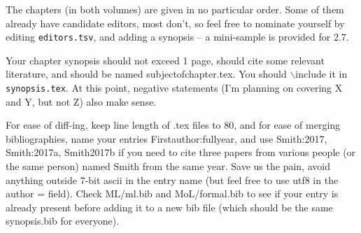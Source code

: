\noindent
The chapters (in both volumes) are given in no particular order. Some of them
already have candidate editors, most don't, so feel free to nominate yourself
by editing {\tt editors.tsv}, and adding a synopsis -- a mini-sample is
provided for 2.7.

Your chapter synopsis should not exceed 1 page, should cite some relevant
literature, and should be named subjectofchapter.tex. You should 
$\backslash$include it in {\tt synopsis.tex}. At this point, negative statements
(I'm planning on covering X and Y, but not Z) also make sense.

For ease of diff-ing, keep line length of .tex files to 80, and for ease of
merging bibliographies, name your entries Firstauthor:fullyear, and use
Smith:2017, Smith:2017a, Smith2017b if you need to cite three papers from
various people (or the same person) named Smith from the same year. Save us
the pain, avoid anything outside 7-bit ascii in the entry name (but feel free
to use utf8 in the author = field). Check ML/ml.bib and MoL/formal.bib to see
if your entry is already present before adding it to a new bib file (which
should be the same synopsis.bib for everyone). 


